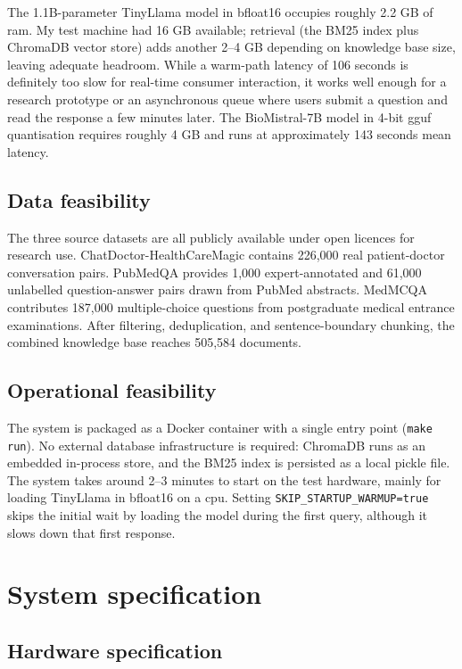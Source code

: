 The 1.1B-parameter TinyLlama model in bfloat16 occupies roughly 2.2 GB of \ac{ram}. My test machine had 16 GB available; retrieval (the BM25 index plus ChromaDB vector store) adds another 2--4 GB depending on knowledge base size, leaving adequate headroom. While a warm-path latency of 106 seconds is definitely too slow for real-time consumer interaction, it works well enough for a research prototype or an asynchronous queue where users submit a question and read the response a few minutes later. The BioMistral-7B model in 4-bit \ac{gguf} quantisation requires roughly 4 GB and runs at approximately 143 seconds mean latency.

\subsection{Data feasibility}

The three source datasets are all publicly available under open licences for research use. ChatDoctor-HealthCareMagic contains 226,000 real patient-doctor conversation pairs. PubMedQA provides 1,000 expert-annotated and 61,000 unlabelled question-answer pairs drawn from PubMed abstracts. MedMCQA contributes 187,000 multiple-choice questions from postgraduate medical entrance examinations. After filtering, deduplication, and sentence-boundary chunking, the combined knowledge base reaches 505,584 documents.

\subsection{Operational feasibility}

The system is packaged as a Docker container with a single entry point (\texttt{make run}). No external database infrastructure is required: ChromaDB runs as an embedded in-process store, and the BM25 index is persisted as a local pickle file. The system takes around 2--3 minutes to start on the test hardware, mainly for loading TinyLlama in bfloat16 on a \ac{cpu}. Setting \texttt{SKIP\_STARTUP\_WARMUP=true} skips the initial wait by loading the model during the first query, although it slows down that first response.

\section{System specification}

\subsection{Hardware specification}

